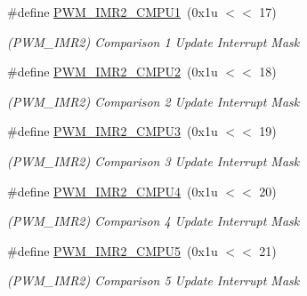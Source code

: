 \begin{DoxyCompactItemize}
\mbox{\label{group__SAME70__PWM_ga85320c2964e2273799154cbb6df51f85}} 
\#define \mbox{\hyperlink{group__SAME70__PWM_ga85320c2964e2273799154cbb6df51f85}{P\+W\+M\+\_\+\+I\+M\+R2\+\_\+\+C\+M\+P\+U1}}~(0x1u $<$$<$ 17)
\begin{DoxyCompactList}\small\item\em (P\+W\+M\+\_\+\+I\+M\+R2) Comparison 1 Update Interrupt Mask \end{DoxyCompactList}\item 
\mbox{\label{group__SAME70__PWM_gaabbf03b3890a7cd9119c68c26c5fbb9a}} 
\#define \mbox{\hyperlink{group__SAME70__PWM_gaabbf03b3890a7cd9119c68c26c5fbb9a}{P\+W\+M\+\_\+\+I\+M\+R2\+\_\+\+C\+M\+P\+U2}}~(0x1u $<$$<$ 18)
\begin{DoxyCompactList}\small\item\em (P\+W\+M\+\_\+\+I\+M\+R2) Comparison 2 Update Interrupt Mask \end{DoxyCompactList}\item 
\mbox{\label{group__SAME70__PWM_ga572a55bdb93d2b19940818b363020729}} 
\#define \mbox{\hyperlink{group__SAME70__PWM_ga572a55bdb93d2b19940818b363020729}{P\+W\+M\+\_\+\+I\+M\+R2\+\_\+\+C\+M\+P\+U3}}~(0x1u $<$$<$ 19)
\begin{DoxyCompactList}\small\item\em (P\+W\+M\+\_\+\+I\+M\+R2) Comparison 3 Update Interrupt Mask \end{DoxyCompactList}\item 
\mbox{\label{group__SAME70__PWM_ga07e94e5f08d7ededb0365897d87afa87}} 
\#define \mbox{\hyperlink{group__SAME70__PWM_ga07e94e5f08d7ededb0365897d87afa87}{P\+W\+M\+\_\+\+I\+M\+R2\+\_\+\+C\+M\+P\+U4}}~(0x1u $<$$<$ 20)
\begin{DoxyCompactList}\small\item\em (P\+W\+M\+\_\+\+I\+M\+R2) Comparison 4 Update Interrupt Mask \end{DoxyCompactList}\item 
\mbox{\label{group__SAME70__PWM_ga633f24c044b3b8358d110b14aba452f5}} 
\#define \mbox{\hyperlink{group__SAME70__PWM_ga633f24c044b3b8358d110b14aba452f5}{P\+W\+M\+\_\+\+I\+M\+R2\+\_\+\+C\+M\+P\+U5}}~(0x1u $<$$<$ 21)
\begin{DoxyCompactList}\small\item\em (P\+W\+M\+\_\+\+I\+M\+R2) Comparison 5 Update Interrupt Mask \end{DoxyCompactList}\item 
$$
\end{DoxyCompactItemize}
